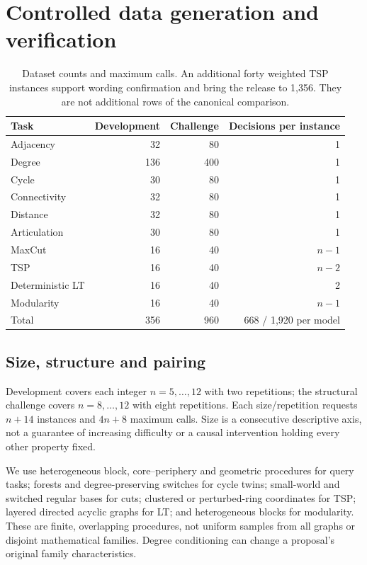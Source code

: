 \section{Controlled data generation and verification}
\label{app:data-details}
\begin{table}[t]
\centering\small
\begin{tabular}{lrrr}
\toprule
Task & Development & Challenge & Decisions per instance\\
\midrule
Adjacency & 32 & 80 & 1\\
Degree & 136 & 400 & 1\\
Cycle & 30 & 80 & 1\\
Connectivity & 32 & 80 & 1\\
Distance & 32 & 80 & 1\\
Articulation & 30 & 80 & 1\\
MaxCut & 16 & 40 & $n-1$\\
TSP & 16 & 40 & $n-2$\\
Deterministic LT & 16 & 40 & 2\\
Modularity & 16 & 40 & $n-1$\\
\midrule
Total & 356 & 960 & 668 / 1,920 per model\\
\bottomrule
\end{tabular}
\caption{Dataset counts and maximum calls. An additional forty weighted TSP
instances support wording confirmation and bring the release to 1,356.
They are not additional rows of the canonical comparison.}
\label{tab:data}
\end{table}

\subsection{Size, structure and pairing}
Development covers each integer $n=5,\ldots,12$ with two repetitions; the
structural challenge covers $n=8,\ldots,12$ with eight repetitions.
Each size/repetition requests $n+14$ instances and $4n+8$ maximum calls.
Size is a consecutive descriptive axis, not a guarantee of increasing
difficulty or a causal intervention holding every other property fixed.

We use heterogeneous block, core--periphery and geometric procedures for
query tasks; forests and degree-preserving switches for cycle twins;
small-world and switched regular bases for cuts; clustered or perturbed-ring
coordinates for TSP; layered directed acyclic graphs for LT; and heterogeneous
blocks for modularity. These are finite, overlapping procedures, not uniform
samples from all graphs or disjoint mathematical families. Degree conditioning
can change a proposal's original family characteristics.

